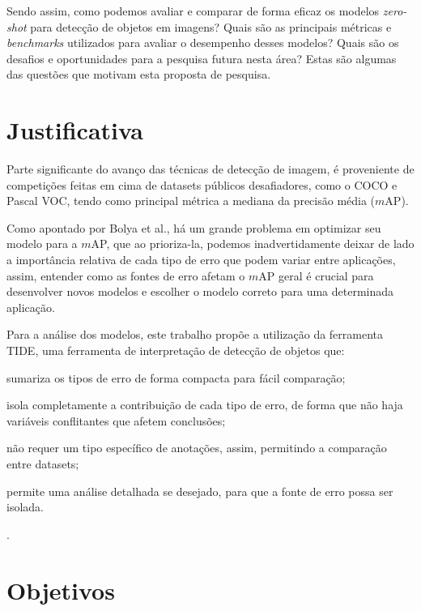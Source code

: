\documentclass[openany, a4paper,12pt, oneside]{article}
\def\map{\(\mathit{m}\)AP}
\begin{document}
Sendo assim, como podemos avaliar e comparar de forma eficaz os modelos \textit{zero-shot} para detecção de objetos em imagens? Quais são as principais métricas e \textit{benchmarks} utilizados para avaliar o desempenho desses modelos? Quais são os desafios e oportunidades para a pesquisa futura nesta área? Estas são algumas das questões que motivam esta proposta de pesquisa.

\section{Justificativa}

Parte significante do avan\c{c}o das t\'{e}cnicas de detec\c{c}\~{a}o de imagem, \'{e} proveniente de competi\c{c}\~{o}es feitas em cima de datasets p\'{u}blicos desafiadores, como o COCO\cite{lin2015} e Pascal VOC\cite{everingham2010}, tendo como principal m\'{e}trica a mediana da precis\~{a}o m\'{e}dia (\map).

Como apontado por Bolya et al.\cite{tide}, h\'{a} um grande problema em optimizar seu modelo para a \map, que ao prioriza-la, podemos inadvertidamente deixar de lado a import\^{a}ncia relativa de cada tipo de erro que podem variar entre aplica\c{c}\~{o}es, assim, entender como as fontes de erro afetam o {\map} geral \'{e} crucial para desenvolver novos modelos e escolher o modelo correto para uma determinada aplica\c{c}\~{a}o.

Para a an\'{a}lise dos modelos, este trabalho prop\~{o}e a utiliza\c{c}\~{a}o da ferramenta TIDE, uma ferramenta de interpreta\c{c}\~{a}o de detec\c{c}\~{a}o de objetos que:
\begin{inparaenum}[(i)]
  \item sumariza os tipos de erro de forma compacta para f\'{a}cil compara\c{c}\~{a}o;
  \item isola completamente a contribui\c{c}\~{a}o de cada tipo de erro, de forma que n\~{a}o haja vari\'{a}veis conflitantes que afetem conclus\~{o}es;
  \item n\~{a}o requer um tipo espec\'{i}fico de anota\c{c}\~{o}es, assim, permitindo a compara\c{c}\~{a}o entre datasets;
  \item permite uma an\'{a}lise detalhada se desejado, para que a fonte de erro possa ser isolada.
\end{inparaenum}
\cite{tide}.

\section{Objetivos}
\end{document}

